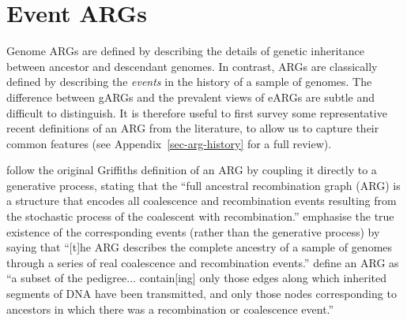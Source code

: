 \documentclass{article}
\begin{document}
\section{Event ARGs}
\label{sec-eARG}
Genome ARGs are defined by
describing the details of genetic inheritance
between ancestor and descendant genomes.
In contrast, ARGs are classically defined
by describing the \emph{events} in the history of a sample of genomes.
The difference between gARGs and the prevalent views of eARGs
are subtle and difficult to distinguish.
It is therefore useful to first survey some representative
recent definitions of
an ARG from the literature, to allow us to capture their common features
(see Appendix~\ref{sec-arg-history} for a full review).

\citet{brandt2021evaluation} follow the original Griffiths definition of
an ARG by coupling it directly to a generative process, stating
that the ``full ancestral recombination graph (ARG) is a structure that encodes all
coalescence and recombination events resulting from the stochastic process of
the coalescent with recombination.''
\citet{shipilina2023origin} emphasise the true existence of the
corresponding events (rather than the generative process) by saying that
``[t]he ARG describes the complete
ancestry of a sample of genomes through a series of real coalescence and
recombination events.''
\cite{mathieson2020ancestry}
define an ARG as ``a subset of the pedigree...
contain[ing] only those edges along which inherited segments of DNA have been
transmitted, and only those nodes corresponding to ancestors in which there was
a recombination or coalescence event.''
\end{document}
